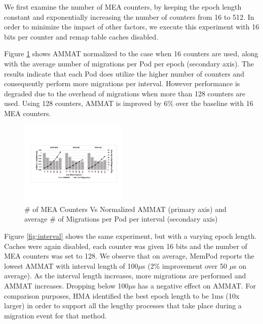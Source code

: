 We first examine the number of MEA counters, by keeping the epoch length constant and exponentially increasing the number of counters from 16 to 512. In order to minimize the impact of other factors, we execute this experiment with 16 bits per counter and remap table caches disabled. 

Figure \ref{fig:num_counters} shows AMMAT normalized to the case when 16 counters are used, along with the average number of migrations per Pod per epoch (secondary axis). The results indicate that each Pod does utilize the higher number of counters and consequently perform more migrations per interval. However performance is degraded due to the overhead of migrations when more than 128 counters are used. Using 128 counters, AMMAT is improved by 6\% over the baseline with 16 MEA counters. 

\begin{figure}[h]
	\centering
  \includegraphics[width=0.46\textwidth]{figures/avg_num_counters_normalized.pdf}
  \caption{\# of MEA Counters Vs Normalized AMMAT (primary axis) and average \# of Migrations per Pod per interval (secondary axis)}
  \label{fig:num_counters}
\end{figure}

Figure \ref{fig:interval} shows the same experiment, but with a varying epoch length. Caches were again disabled, each counter was given 16 bits and the number of MEA counters was set to 128. We observe that on average, MemPod reports the lowest AMMAT with interval length of 100$\mu$s (2\% improvement over 50 $\mu$s on average). As the interval length increases, more migrations are performed and AMMAT increases. Dropping below 100$\mu$s has a negative effect on AMMAT. For comparison purposes, HMA \cite{meswani-HPCA21} identified the best epoch length to be 1ms (10x larger) in order to support all the lengthy processes that take place during a migration event for that method.

